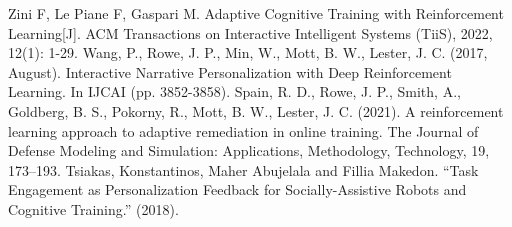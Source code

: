 \documentclass[12pt]{article}
\begin{document}
\begin{thebibliography}{99}
        Zini F, Le Piane F, Gaspari M. Adaptive Cognitive Training with Reinforcement Learning[J]. ACM Transactions on Interactive Intelligent Systems (TiiS), 2022, 12(1): 1-29.
        Wang, P., Rowe, J. P., Min, W., Mott, B. W.,  Lester, J. C. (2017, August). Interactive Narrative Personalization with Deep Reinforcement Learning. In IJCAI (pp. 3852-3858).
        Spain, R. D., Rowe, J. P., Smith, A., Goldberg, B. S., Pokorny, R., Mott, B. W., Lester, J. C. (2021). A reinforcement learning approach to adaptive remediation in online training. The Journal of Defense Modeling and Simulation: Applications, Methodology, Technology, 19, 173–193. 
        Tsiakas, Konstantinos, Maher Abujelala and Fillia Makedon. “Task Engagement as Personalization Feedback for Socially-Assistive Robots and Cognitive Training.” (2018).      
        
    \end{thebibliography}
\end{document}
